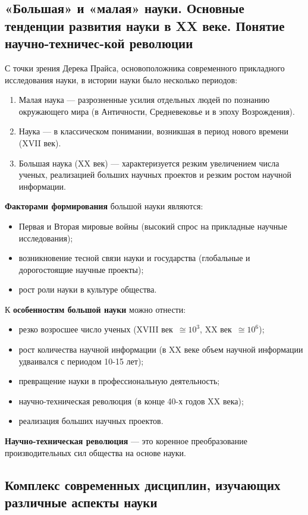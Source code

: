 \subsection{«Большая» и «малая» науки. Основные тенденции развития науки в XX веке. Понятие научно-техничес-кой революции}

С точки зрения Дерека Прайса, основоположника современного прикладного исследования науки, в истории науки было несколько периодов:
\begin{enumerate}
    \item Малая наука --- разрозненные усилия отдельных людей по познанию окружающего мира (в Античности, Средневековье и в эпоху Возрождения).
    \item Наука --- в классическом понимании, возникшая в период нового времени (XVII век).
    \item Большая наука (XX век) --- характеризуется резким увеличением числа ученых, реализацией больших научных проектов и резким ростом научной информации.
\end{enumerate}
\textbf{Факторами формирования} большой науки являются:
\begin{itemize}
    \item Первая и Вторая мировые войны (высокий спрос на прикладные научные исследования);
    \item возникновение тесной связи науки и государства (глобальные и дорогостоящие научные проекты);
    \item рост роли науки в культуре общества.
\end{itemize}
К \textbf{особенностям большой науки} можно отнести:
\begin{itemize}
    \item резко возросшее число ученых (XVIII век~$\cong 10^3$, XX век~$\cong 10^6$);
    \item рост количества научной информации (в XX веке объем научной информации удваивался с периодом 10-15 лет);
    \item превращение науки в профессиональную деятельность;
    \item научно-техническая революция (в конце 40-х годов XX века);
    \item реализация больших научных проектов.
\end{itemize}

\textbf{Научно-техническая революция} --- это коренное преобразование производительных сил общества на основе науки.

\subsection{Комплекс современных дисциплин, изучающих различные аспекты науки}


